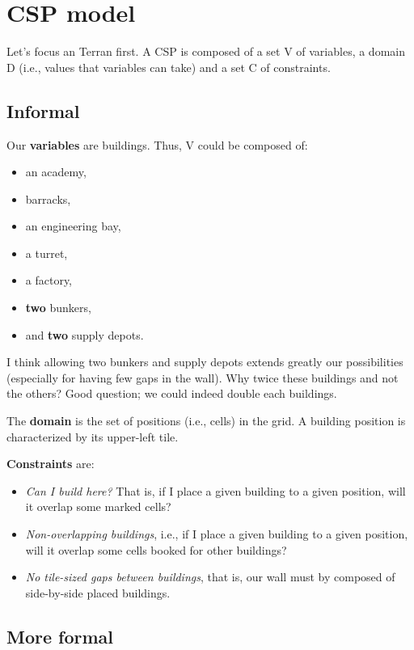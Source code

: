 \documentclass[11pt]{article}
\begin{document}
\section{CSP model}

Let's  focus  an Terran  first.  A  CSP is  composed  of  a  set V  of
variables, a domain D (i.e., values that variables can take) and a set C
of constraints.

\subsection{Informal}

Our {\bf variables} are buildings. Thus, V could be composed of:
\begin{itemize}
\item an academy,
\item barracks,
\item an engineering bay,
\item a turret,
\item a factory,
\item {\bf two} bunkers,
\item and {\bf two} supply depots.
\end{itemize}

I think  allowing two  bunkers and supply  depots extends  greatly our
possibilities (especially for having few  gaps in the wall). Why twice
these buildings  and not  the others? Good  question; we  could indeed
double each buildings.

The  {\bf  domain}  is the  set  of  positions  (i.e., cells)  in  the
grid. A building position is characterized by its upper-left tile.

{\bf Constraints} are:
\begin{itemize}
\item {\em Can I build here?} That  is, if I place a given building to
  a given position, will it overlap some marked cells?
\item {\em Non-overlapping buildings}, i.e., if I place a given building to
  a  given position,  will  it  overlap some  cells  booked for  other
  buildings?
\item {\em  No tile-sized gaps  between buildings}, that is,  our wall
  must by composed of side-by-side placed buildings.
\end{itemize}

\subsection{More formal}
\end{document}
